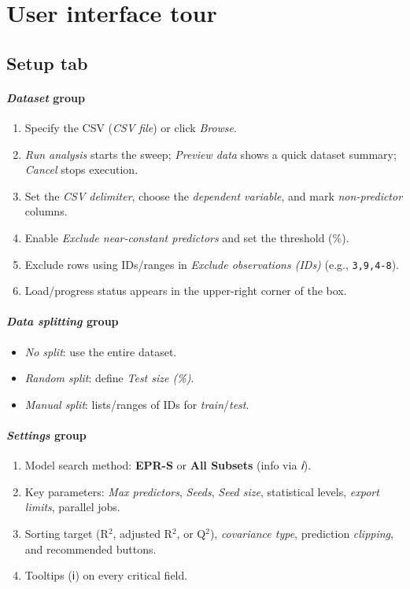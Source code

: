 \documentclass[12pt,a4paper]{article}
\begin{document}
\section{User interface tour}
\subsection{\textbf{Setup} tab}
\paragraph{\emph{Dataset} group}
\begin{enumerate}[label=\arabic*.]
  \item Specify the CSV (\emph{CSV file}) or click \emph{Browse}.
  \item \emph{Run analysis} starts the sweep; \emph{Preview data} shows a quick dataset summary; \emph{Cancel} stops execution.
  \item Set the \emph{CSV delimiter}, choose the \emph{dependent variable}, and mark \emph{non-predictor} columns.
  \item Enable \emph{Exclude near-constant predictors} and set the threshold (\%).
  \item Exclude rows using IDs/ranges in \emph{Exclude observations (IDs)} (e.g., \texttt{3,9,4-8}).
  \item Load/progress status appears in the upper-right corner of the box.
\end{enumerate}

\paragraph{\emph{Data splitting} group}
\begin{itemize}
  \item \emph{No split}: use the entire dataset.
  \item \emph{Random split}: define \emph{Test size (\%)}.
  \item \emph{Manual split}: lists/ranges of IDs for \textit{train}/\textit{test}.
\end{itemize}

\paragraph{\emph{Settings} group}
\begin{enumerate}[label=\arabic*.]
  \item Model search method: \textbf{EPR-S} or \textbf{All Subsets} (info via \emph{ℹ}).
  \item Key parameters: \emph{Max predictors}, \emph{Seeds}, \emph{Seed size}, statistical levels, \emph{export limits}, parallel jobs.
  \item Sorting target (R$^2$, adjusted R$^2$, or Q$^2$), \emph{covariance type}, prediction \emph{clipping}, and recommended buttons.
  \item Tooltips (ℹ) on every critical field.
\end{enumerate}
\end{document}
